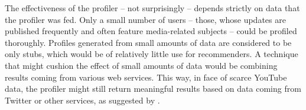 The effectiveness of the profiler -- not surprisingly -- depends strictly on data
that the profiler was fed. Only a small number of users -- those, whose updates
are published frequently and often feature media-related subjects -- could be
profiled thoroughly. Profiles generated from small amounts of data are considered
to be only stubs, which would be of relatively little use for recommenders. A technique that
might cushion the effect of small amounts of data would be combining results
coming from various web services. This way, in face of scarce YouTube data, the
profiler might still return meaningful results based on data coming from
Twitter or other services, as suggested by \cite{public-profiles}.
